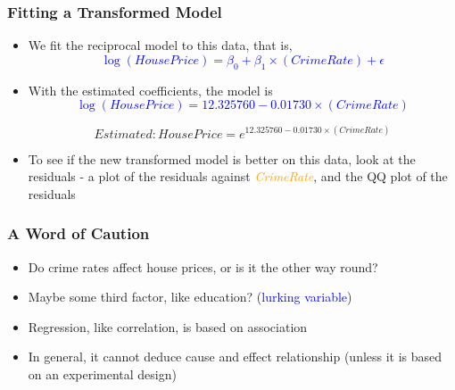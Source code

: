 \documentclass[compress]{beamer}
\begin{document}
\begin{frame}
\frametitle{\sc Fitting a Transformed Model}
	\begin{itemize}
	\item We fit the reciprocal model to this data, that is, 
\textcolor{blue}{\[
\log(HousePrice) = \beta_0 + \beta_1 \times (CrimeRate)+\epsilon
\]}
	\item With the estimated coefficients, the model is 
\textcolor{blue}{\[
\log(HousePrice)  =12.325760 -0.01730 \times (CrimeRate)
\]}

\[
Estimated: HousePrice  =e^{12.325760 -0.01730 \times (CrimeRate)}
\]
	\item To see if the new transformed model is better on this data, look at the residuals - a plot of the residuals against \textcolor{orange}{\textit{CrimeRate}}, and the QQ plot of the residuals
	\end{itemize}
\end{frame}
%
%

\begin{frame}
\frametitle{A Word of Caution}
	\begin{itemize}
	\item Do crime rates affect house prices, or is it the other way round? 
	\item Maybe some third factor, like education? (\textcolor{blue}{lurking variable})
	\item Regression, like correlation, is based on association
	\item In general, it cannot deduce cause and effect relationship (unless it is based on an experimental design)
	\end{itemize}
\end{frame}
\end{document}
